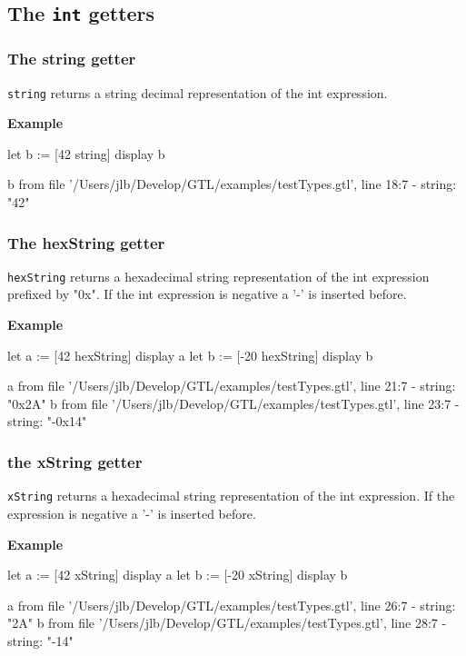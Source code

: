 \documentclass[10pt,openright,twosides]{report}
\newcommand{\gtltype}[1]{{\small\ttfamily #1}}
\newcommand{\ccst}[1]{{\footnotesize\ttfamily\colorbox{light-blue}{'#1'}}}
\newcommand{\scst}[1]{{\footnotesize\ttfamily\colorbox{light-blue}{"#1"}}}
\newcommand{\gtlinline}[1]{\colorbox{light-blue}{\lstinline[language=gtl]{#1}}}
\newcommand{\example}{\vspace{.75em}\noindent\textbf{Example}\vspace{0em}}
\begin{document}
\subsection{The \texttt{int} getters}

\subsubsection{The {\bfseries\ttfamily string} getter}

\gtlinline{string} returns a string decimal representation of the \gtltype{int} expression. 

\example
\begin{gtl}
let b := [42 string]
display b
\end{gtl}
\begin{console}
b from file '/Users/jlb/Develop/GTL/examples/testTypes.gtl', line 18:7
  - string: "42"
\end{console}


\subsubsection{The {\bfseries\ttfamily hexString} getter}

\gtlinline{hexString} returns a hexadecimal string representation of the int expression prefixed by \scst{0x}. If the int expression is negative a \ccst{-} is inserted before.

\example
\begin{gtl}
let a := [42 hexString]
display a
let b := [-20 hexString]
display b
\end{gtl}
\begin{console}
a from file '/Users/jlb/Develop/GTL/examples/testTypes.gtl', line 21:7
  - string: "0x2A"
b from file '/Users/jlb/Develop/GTL/examples/testTypes.gtl', line 23:7
  - string: "-0x14"
\end{console}

\subsubsection{the {\bfseries\ttfamily xString} getter}

\gtlinline{xString} returns a hexadecimal string representation of the int expression. If the expression is negative a \ccst{-} is inserted before.

\example
\begin{gtl}
let a := [42 xString]
display a
let b := [-20 xString]
display b
\end{gtl}
\begin{console}
a from file '/Users/jlb/Develop/GTL/examples/testTypes.gtl', line 26:7
  - string: "2A"
b from file '/Users/jlb/Develop/GTL/examples/testTypes.gtl', line 28:7
  - string: "-14"
\end{console}
\end{document}
